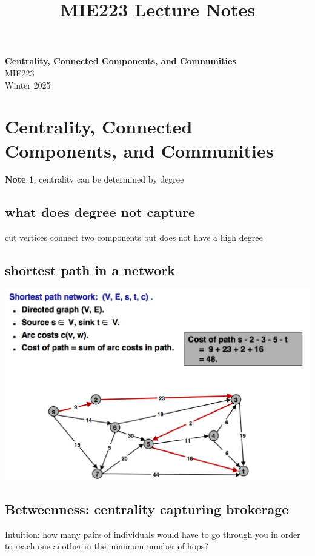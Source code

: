 \documentclass[11pt]{article}
\theoremstyle{definition}
\newtheorem{note}{Note}
\begin{document}
\setcounter{section}{0}
\title{MIE223 Lecture Notes}

\thispagestyle{empty}

\begin{center}
{\LARGE \bf Centrality,
Connected Components,
and Communities}\\
{\large MIE223}\\
Winter 2025
\end{center}
\section{Centrality,
Connected Components,
and Communities}

\begin{note}
centrality can be determined by degree
\end{note}

\subsection{what does degree not capture}

cut vertices connect two components but does not have a high degree

\subsection{shortest path in a network}
\includegraphics[width=\textwidth/2]{16.png}

\subsection{Betweenness: centrality capturing brokerage}
Intuition: how many pairs of individuals
would have to go through you in order to
reach one another in the minimum number
of hops?
\end{document}
